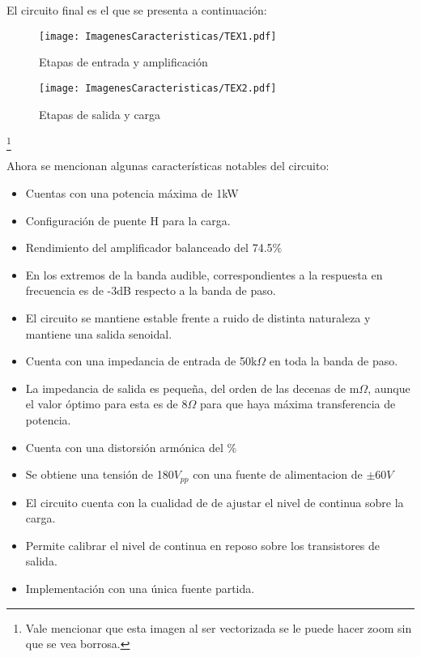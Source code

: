 


El circuito final es el que se presenta a continuación:
 \begin{figure}[H]
\centering
	\texttt{[image: ImagenesCaracteristicas/TEX1.pdf]}
	\caption{Etapas de entrada y amplificación}
	\label{fig:circ}
\end{figure}
 \begin{figure}[H]
\centering
	\texttt{[image: ImagenesCaracteristicas/TEX2.pdf]}
	\caption{Etapas de salida y carga}
	\label{fig:circ}
\end{figure}\footnote{Vale mencionar que esta imagen al ser vectorizada se le puede hacer zoom sin que se vea borrosa.}

Ahora se mencionan algunas características notables del circuito:
\begin{itemize}
\item Cuentas con una potencia máxima de 1kW
\item Configuración de puente H  para la carga.
\item Rendimiento del amplificador balanceado del 74.5$\%$
\item En los extremos de la banda audible, correspondientes a la respuesta en frecuencia es de -3dB respecto a la banda de paso.

\item El circuito se mantiene estable frente a ruido de distinta naturaleza y mantiene una salida senoidal.

\item Cuenta con una impedancia de entrada de 50k$\Omega$ en toda la banda de paso.
\item La impedancia de salida es pequeña, del orden de las decenas de m$\Omega$, aunque el valor óptimo para esta es de 8$\Omega$ para que haya máxima transferencia de potencia.


\item Cuenta con una distorsión armónica del $\%$
\item Se obtiene una tensión de 180$V_{pp}$ con una fuente de  alimentacion de $\pm 60V$
\item El circuito cuenta con la cualidad de de ajustar el nivel de continua sobre la carga.
\item Permite calibrar el nivel de continua en reposo sobre los transistores de salida.
\item Implementación con una única fuente partida.



\end{itemize}

